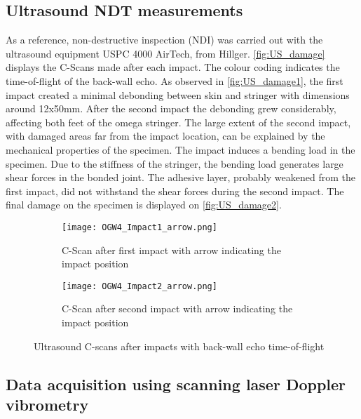 \documentclass[times,final]{elsarticle}
\begin{document}
\subsection{Ultrasound NDT measurements}

As a reference, non-destructive inspection (NDI) was carried out with the ultrasound equipment USPC 4000 AirTech, from Hillger. \autoref{fig:US_damage} displays the C-Scans made after each impact. The colour coding indicates the time-of-flight of the back-wall echo. As observed in \autoref{fig:US_damage1}, the first impact created a minimal debonding between skin and stringer with dimensions around 12x50mm. After the second impact the debonding grew considerably, affecting both feet of the omega stringer. The large extent of the second impact, with damaged areas far from the impact location, can be explained by the mechanical properties of the specimen. The impact induces a bending load in the specimen. Due to the stiffness of the stringer, the bending load generates large shear forces in the bonded joint. The adhesive layer, probably weakened from the first impact, did not withstand the shear forces during the second impact. The final damage on the specimen is displayed on \autoref{fig:US_damage2}.

\begin{figure} [htp]
	\centering
	\begin{subfigure}[b]{\textwidth}
	\centering
		\texttt{[image: OGW4\_Impact1\_arrow.png]}
		\caption{C-Scan after first impact with arrow indicating the impact position}
		\label{fig:US_damage1}
	\end{subfigure}
	
	\begin{subfigure}[b]{\textwidth}
	\centering
		\texttt{[image: OGW4\_Impact2\_arrow.png]}
		\caption{C-Scan after second impact with arrow indicating the impact position}
		\label{fig:US_damage2}
	\end{subfigure}
	\caption{Ultrasound C-scans after impacts with back-wall echo time-of-flight}
	\label{fig:US_damage}
\end{figure}

\subsection{Data acquisition using scanning laser Doppler vibrometry}
\end{document}
